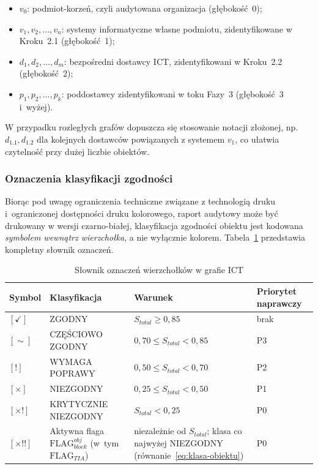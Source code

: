\begin{itemize}
    \item $v_0$: podmiot-korzeń, czyli audytowana organizacja (głębokość~0);
    \item $v_1, v_2, \ldots, v_n$: systemy informatyczne własne podmiotu, zidentyfikowane w Kroku~2.1 (głębokość~1);
    \item $d_1, d_2, \ldots, d_m$: bezpośredni dostawcy ICT, zidentyfikowani w Kroku~2.2 (głębokość~2);
    \item $p_1, p_2, \ldots, p_k$: poddostawcy zidentyfikowani w toku Fazy~3 (głębokość~3 i~wyżej).
\end{itemize}

W przypadku rozległych grafów dopuszcza się stosowanie notacji złożonej, np.\ $d_{1.1}, d_{1.2}$ dla kolejnych dostawców powiązanych z systemem $v_1$, co ułatwia czytelność przy dużej liczbie obiektów.

\subsubsection{Oznaczenia klasyfikacji zgodności}
\label{sec:oznaczenia-zgodnosci}

Biorąc pod uwagę ograniczenia techniczne związane z technologią druku i~ograniczonej dostępności druku kolorowego,  raport audytowy może być drukowany w wersji czarno-białej, klasyfikacja zgodności obiektu jest kodowana \emph{symbolem wewnątrz wierzchołka}, a nie wyłącznie kolorem. Tabela~\ref{tab:oznaczenia-grafu} przedstawia kompletny słownik oznaczeń.

\begin{table}[ht]
\renewcommand{\arraystretch}{1.4}
\caption{Słownik oznaczeń wierzchołków w grafie ICT}
\label{tab:oznaczenia-grafu}
\begin{tabular}{p{2cm} p{4cm} p{4.5cm} p{3cm}}
\hline
\textbf{Symbol} & \textbf{Klasyfikacja} & \textbf{Warunek} & \textbf{Priorytet naprawczy} \\
\hline
$[\checkmark]$ & ZGODNY & $S_{total} \geq 0{,}85$ & brak \\
$[\sim]$ & CZĘŚCIOWO ZGODNY & $0{,}70 \leq S_{total} < 0{,}85$ & P3 \\
$[!]$   & WYMAGA POPRAWY   & $0{,}50 \leq S_{total} < 0{,}70$ & P2 \\
$[\times]$ & NIEZGODNY & $0{,}25 \leq S_{total} < 0{,}50$ & P1 \\
$[\times!]$ & KRYTYCZNIE NIEZGODNY & $S_{total} < 0{,}25$ & P0 \\
$[\times!!]$ & Aktywna flaga $\text{FLAG}_{block}^{obj}$ \newline (w~tym $\text{FLAG}_{TIA}$) & niezależnie od $S_{total}$; klasa co najwyżej NIEZGODNY (równanie~\eqref{eq:klasa-obiektu}) & P0 \\
\hline
\end{tabular}
\end{table}

